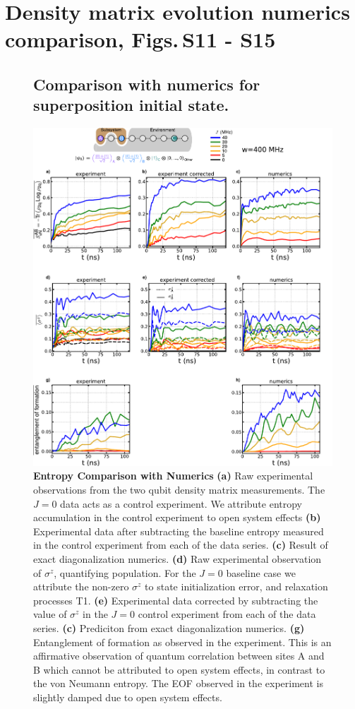 \section{Density matrix evolution numerics comparison, Figs.\,S11 - S15}
\begin{figure}[tbh]
\subsection{Comparison with numerics for superposition initial state.}
\centering
\includegraphics[width=140mm, keepaspectratio]{./PDF/dat_cor_num_superposition_linear.pdf}
\caption{\textbf{Entropy Comparison with Numerics}
\textbf{(a)} Raw experimental observations from the two qubit density matrix measurements.  The $J=0$ data acts as a control experiment.
We attribute entropy accumulation in the control experiment to open system effects
\textbf{(b)} Experimental data after subtracting the baseline entropy measured in the control experiment from each of the data series.
\textbf{(c)} Result of exact diagonalization numerics.
\textbf{(d)} Raw experimental observation of $\sigma^z$, quantifying population.
For the $J=0$ baseline case we attribute the non-zero $\sigma^z$ to state initialization error, and relaxation processes T1.
\textbf{(e)} Experimental data corrected by subtracting the value of $\sigma^z$ in the $J=0$ control experiment from each of the data series.
\textbf{(c)} Prediciton from exact diagonalization numerics.
\textbf{(g)} Entanglement of formation as observed in the experiment.
This is an affirmative observation of quantum correlation between sites A and B which cannot be attributed to open system effects, in contrast to the von Neumann entropy.
The EOF observed in the experiment is slightly damped due to open system effects.}
\end{figure}

